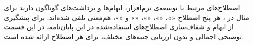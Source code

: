 
اصطلاح‌های مرتبط با توسعه‌ی نرم‌افزار، ابهام‌ها و برداشت‌های گوناگون دارند
برای مثال در ، هر پنج اصطلاح
«»، «»، «»، «» و «»،
هم‌معنی تلقی شده‌اند. برای پیشگیری از ابهام و شفاف‌سازی اصطلاح‌های استفاده‌شده
در این پایان‌نامه، در این قسمت توضیحی اجمالی و بدون ارزیابی جنبه‌های
مختلف، برای هر اصطلاح ارائه شده است.















